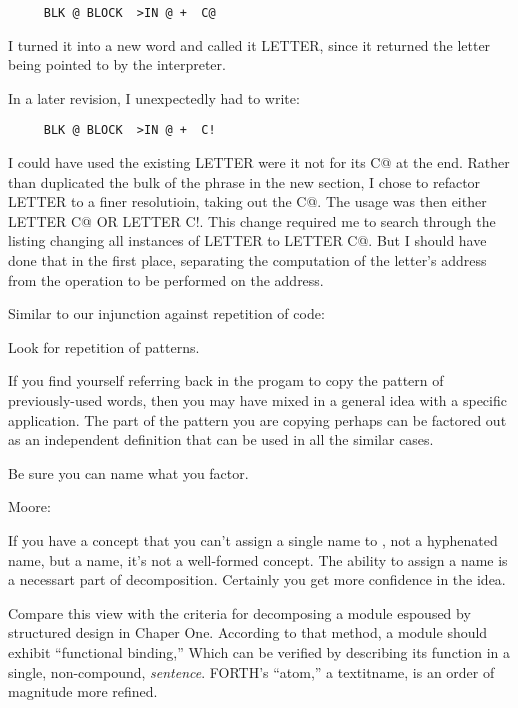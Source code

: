 \begin{verbatim}
     BLK @ BLOCK  >IN @ +  C@
\end{verbatim}
I turned it into a new word and called it LETTER, since it returned the letter being pointed to by the interpreter.

In a later revision, I unexpectedly had to write:

\begin{verbatim}
     BLK @ BLOCK  >IN @ +  C!
\end{verbatim}
I could have used the existing LETTER were it not for its C@ at the end. Rather than duplicated the bulk of the phrase in the new section, I chose to refactor LETTER to a finer resolutioin, taking out the C@. The usage was then either LETTER C@ OR LETTER C!. This change required me to search through the listing changing all instances of LETTER to LETTER C@. But I should have done that in the first place, separating the computation of the letter's address from the operation to be performed on the address.

Similar to our injunction against repetition of code:

\begin{tip}
Look for repetition of patterns.
\end{tip}
If you find yourself referring back in the progam to copy the pattern of previously-used words, then you may have mixed in a general idea with a specific application. The part of the pattern you are copying perhaps can be factored out as an independent definition that can be used in all the similar cases.

\begin{tip}
Be sure you can name what you factor.
\end{tip}

\bigskip
\blackline{2ex}
\noindent Moore:

\begin{tfquot}
If you have a concept that you can't assign a single name to , not a hyphenated name, but a name, it's not a well-formed concept. The ability to assign a name is a necessart part of decomposition. Certainly you get more confidence in the idea.
\end{tfquot}
\blackline{1ex}
Compare this view with the criteria for decomposing a module espoused by structured design in Chaper One. According to that method, a module should exhibit ``functional binding,'' Which can be verified by describing its function in a single, non-compound, \textit{sentence}. FORTH's ``atom,'' a textit{name}, is an order of magnitude more refined.

